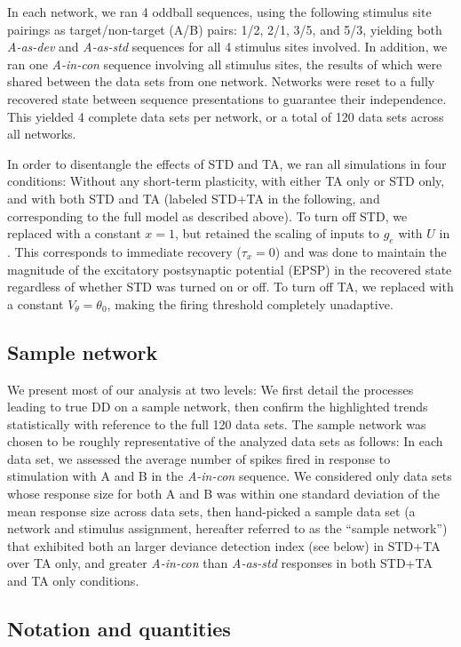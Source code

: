 \documentclass[9pt,lineno,onehalfspacing]{elife}
\newcommand{\dev}{\textit{A-as-dev}}
\newcommand{\msc}{\textit{A-in-con}}
\newcommand{\std}{\textit{A-as-std}}
\begin{document}
In each network, we ran 4 oddball sequences, using the following stimulus site pairings as target/non-target (A/B) pairs: 1/2, 2/1, 3/5, and 5/3, yielding both \dev{} and \std{} sequences for all 4 stimulus sites involved. In addition, we ran one \msc{} sequence involving all stimulus sites, the results of which were shared between the data sets from one network. Networks were reset to a fully recovered state between sequence presentations to guarantee their independence. This yielded 4 complete data sets per network, or a total of 120 data sets across all networks.

In order to disentangle the effects of STD and TA, we ran all simulations in four conditions: Without any short-term plasticity, with either TA only or STD only, and with both STD and TA (labeled STD+TA in the following, and corresponding to the full model as described above). To turn off STD, we replaced  with a constant $x = 1$, but retained the scaling of inputs to $g_e$ with $U$ in . This corresponds to immediate recovery ($\tau_x = 0$) and was done to maintain the magnitude of the excitatory postsynaptic potential (EPSP) in the recovered state regardless of whether STD was turned on or off. To turn off TA, we replaced  with a constant $V_{\theta} = \theta_0$, making the firing threshold completely unadaptive.

\subsection{Sample network}\label{sec:sample}

We present most of our analysis at two levels: We first detail the processes leading to true DD on a sample network, then confirm the highlighted trends statistically with reference to the full 120 data sets. The sample network was chosen to be roughly representative of the analyzed data sets as follows: In each data set, we assessed the average number of spikes fired in response to stimulation with A and B in the \msc{} sequence. We considered only data sets whose response size for both A and B was within one standard deviation of the mean response size across data sets, then hand-picked a sample data set (a network and stimulus assignment, hereafter referred to as the ``sample network'') that exhibited both an larger deviance detection index (see  below) in STD+TA over TA only, and greater \msc{} than \std{} responses in both STD+TA and TA only conditions.

\subsection{Notation and quantities}\label{sec:notation}
\end{document}
